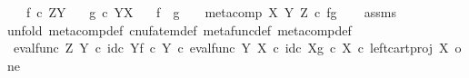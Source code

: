 \begin{isabellebody}
\ \ \ {\isachardoublequoteopen}f\ {\isasymin}\isactrlsub c\ Z\isactrlbsup Y\isactrlesup {\isachardoublequoteclose}\isanewline
\ \ \ {\isachardoublequoteopen}g\ {\isasymin}\isactrlsub c\ Y\isactrlbsup X\isactrlesup {\isachardoublequoteclose}\isanewline
\ \ \ {\isachardoublequoteopen}f\ {\isasymbox}\ g\ \ \ {\isacharequal}{\kern0pt}\ meta{\isacharunderscore}{\kern0pt}comp\ X\ Y\ Z\ {\isasymcirc}\isactrlsub c\ {\isasymlangle}f{\isacharcomma}{\kern0pt}g{\isasymrangle}{\isachardoublequoteclose}\isanewline
%
\isadelimproof
\ \ %
\endisadelimproof
%
\isatagproof
{}\isamarkupfalse%
\ assms\ \isanewline
{}\isamarkupfalse%
{\isacharparenleft}{\kern0pt}unfold\ meta{\isacharunderscore}{\kern0pt}comp{}{\isacharunderscore}{\kern0pt}def{}\ cnufatem{\isacharunderscore}{\kern0pt}def{}\ metafunc{\isacharunderscore}{\kern0pt}def\ meta{\isacharunderscore}{\kern0pt}comp{\isacharunderscore}{\kern0pt}def{\isacharparenright}{\kern0pt}\ \ \ \ \ \ \ \ \ \ \isanewline
\ \ \isamarkupfalse%
\ {\isachardoublequoteopen}{\isacharparenleft}{\kern0pt}{\isacharparenleft}{\kern0pt}{\isacharparenleft}{\kern0pt}eval{\isacharunderscore}{\kern0pt}func\ Z\ Y\ {\isasymcirc}\isactrlsub c\ {\isasymlangle}id\isactrlsub c\ Y{\isacharcomma}{\kern0pt}f\ {\isasymcirc}\isactrlsub c\ {\isasymbeta}\isactrlbsub Y\isactrlesub {\isasymrangle}{\isacharparenright}{\kern0pt}\ {\isasymcirc}\isactrlsub c\ eval{\isacharunderscore}{\kern0pt}func\ Y\ X\ {\isasymcirc}\isactrlsub c\ {\isasymlangle}id\isactrlsub c\ X{\isacharcomma}{\kern0pt}g\ {\isasymcirc}\isactrlsub c\ {\isasymbeta}\isactrlbsub X\isactrlesub {\isasymrangle}{\isacharparenright}{\kern0pt}\ {\isasymcirc}\isactrlsub c\ left{\isacharunderscore}{\kern0pt}cart{\isacharunderscore}{\kern0pt}proj\ X\ one{\isacharparenright}{\kern0pt}\ {\isacharequal}{\kern0pt}\ \ \isanewline

\end{isabellebody}
